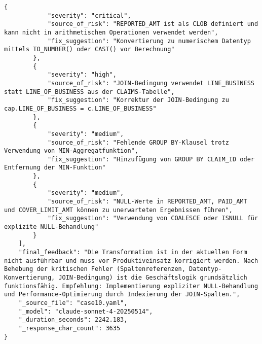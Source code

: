 \begin{lstlisting}[caption={Ausgabe: Claude Sonnet 4 Anwendungsfall 10 Robustheitsdurchlauf},label={claude_case10_prompt3}]
        {
            "severity": "critical",
            "source_of_risk": "REPORTED_AMT ist als CLOB definiert und kann nicht in arithmetischen Operationen verwendet werden",
            "fix_suggestion": "Konvertierung zu numerischem Datentyp mittels TO_NUMBER() oder CAST() vor Berechnung"
        },
        {
            "severity": "high",
            "source_of_risk": "JOIN-Bedingung verwendet LINE_BUSINESS statt LINE_OF_BUSINESS aus der CLAIMS-Tabelle",
            "fix_suggestion": "Korrektur der JOIN-Bedingung zu cap.LINE_OF_BUSINESS = c.LINE_OF_BUSINESS"
        },
        {
            "severity": "medium",
            "source_of_risk": "Fehlende GROUP BY-Klausel trotz Verwendung von MIN-Aggregatfunktion",
            "fix_suggestion": "Hinzufügung von GROUP BY CLAIM_ID oder Entfernung der MIN-Funktion"
        },
        {
            "severity": "medium",
            "source_of_risk": "NULL-Werte in REPORTED_AMT, PAID_AMT und COVER_LIMIT_AMT können zu unerwarteten Ergebnissen führen",
            "fix_suggestion": "Verwendung von COALESCE oder ISNULL für explizite NULL-Behandlung"
        }
    ],
    "final_feedback": "Die Transformation ist in der aktuellen Form nicht ausführbar und muss vor Produktiveinsatz korrigiert werden. Nach Behebung der kritischen Fehler (Spaltenreferenzen, Datentyp-Konvertierung, JOIN-Bedingung) ist die Geschäftslogik grundsätzlich funktionsfähig. Empfehlung: Implementierung expliziter NULL-Behandlung und Performance-Optimierung durch Indexierung der JOIN-Spalten.",
    "_source_file": "case10.yaml",
    "_model": "claude-sonnet-4-20250514",
    "_duration_seconds": 2242.183,
    "_response_char_count": 3635
}
\end{lstlisting}

